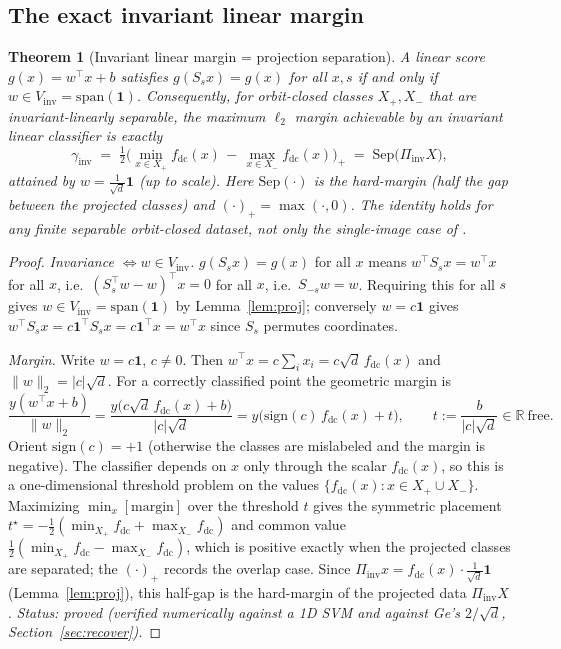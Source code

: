 \documentclass[11pt]{article}
\theoremstyle{plain}
\newtheorem{theorem}{Theorem}
\theoremstyle{definition}
\theoremstyle{remark}
\newcommand{\R}{\mathbb{R}}
\newcommand{\fdc}{f_{\mathrm{dc}}}
\newcommand{\Vinv}{V_{\mathrm{inv}}}
\newcommand{\Sep}{\mathrm{Sep}}
\newcommand{\one}{\mathbf 1}
\newcommand{\Piinv}{\Pi_{\mathrm{inv}}}
\newcommand{\inv}{\mathrm{inv}}
\newcommand{\sign}{\mathrm{sign}}
\begin{document}
\subsection{The exact invariant linear margin}
\begin{theorem}[Invariant linear margin {=} projection separation]\label{thm:A}
A linear score $g(x)=w^\top x+b$ satisfies $g(S_sx)=g(x)$ for all $x,s$ if and only if $w\in\Vinv=\mathrm{span}(\one)$. Consequently, for orbit-closed classes $X_+,X_-$ that are invariant-linearly separable, the maximum $\ell_2$ margin achievable by an invariant linear classifier is exactly
\begin{equation}\label{eq:A}
\gamma_\inv \;=\; \tfrac12\Big(\min_{x\in X_+}\fdc(x)\,-\,\max_{x\in X_-}\fdc(x)\Big)_{+}\;=\;\Sep\big(\Piinv X\big),
\end{equation}
attained by $w=\tfrac1{\sqrt d}\one$ (up to scale). Here $\Sep(\cdot)$ is the hard-margin (half the gap between the projected classes) and $(\cdot)_+=\max(\cdot,0)$. The identity holds for \emph{any} finite separable orbit-closed dataset, not only the single-image case of \citet{ge2021shift}.
\end{theorem}
\begin{proof}
\emph{Invariance $\Leftrightarrow w\in\Vinv$.} $g(S_sx)=g(x)$ for all $x$ means $w^\top S_sx=w^\top x$ for all $x$, i.e.\ $(S_s^\top w-w)^\top x=0$ for all $x$, i.e.\ $S_{-s}w=w$. Requiring this for all $s$ gives $w\in\Vinv=\mathrm{span}(\one)$ by Lemma~\ref{lem:proj}; conversely $w=c\one$ gives $w^\top S_sx=c\one^\top S_sx=c\one^\top x=w^\top x$ since $S_s$ permutes coordinates.

\emph{Margin.} Write $w=c\one$, $c\neq0$. Then $w^\top x=c\sum_i x_i=c\sqrt d\,\fdc(x)$ and $\|w\|_2=|c|\sqrt d$. For a correctly classified point the geometric margin is
\[
\frac{y(w^\top x+b)}{\|w\|_2}=\frac{y\big(c\sqrt d\,\fdc(x)+b\big)}{|c|\sqrt d}=y\Big(\sign(c)\,\fdc(x)+t\Big),\qquad t:=\frac{b}{|c|\sqrt d}\in\R\ \text{free.}
\]
Orient $\sign(c)=+1$ (otherwise the classes are mislabeled and the margin is negative). The classifier depends on $x$ only through the scalar $\fdc(x)$, so this is a one-dimensional threshold problem on the values $\{\fdc(x):x\in X_+\cup X_-\}$. Maximizing $\min_x [\text{margin}]$ over the threshold $t$ gives the symmetric placement $t^\star=-\tfrac12(\min_{X_+}\fdc+\max_{X_-}\fdc)$ and common value $\tfrac12(\min_{X_+}\fdc-\max_{X_-}\fdc)$, which is positive exactly when the projected classes are separated; the $(\cdot)_+$ records the overlap case. Since $\Piinv x=\fdc(x)\cdot\tfrac1{\sqrt d}\one$ (Lemma~\ref{lem:proj}), this half-gap is the hard-margin of the projected data $\Piinv X$. \emph{Status: proved (verified numerically against a 1D SVM and against Ge's $2/\sqrt d$, Section~\ref{sec:recover}).}
\end{proof}
\end{document}
